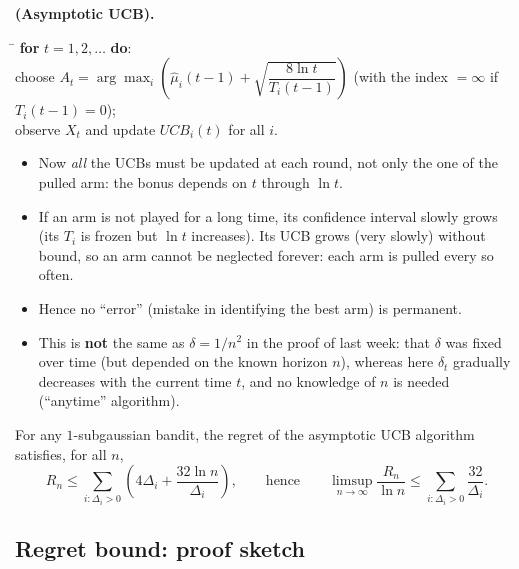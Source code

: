 \begin{definition}\textbf{(Asymptotic UCB).}
\begin{tabbing}
\hspace{1.5em}\=\kill
\textbf{for} $t = 1, 2, \dots$ \textbf{do}: \\
\> choose $A_t = \arg\max_i \left(\hat{\mu}_i(t-1) + \sqrt{\dfrac{8\ln t}{T_i(t-1)}}\right)$ \quad (with the index $= \infty$ if $T_i(t-1) = 0$); \\
\> observe $X_t$ and update $UCB_i(t)$ for all $i$.
\end{tabbing}
\end{definition}

\begin{remark}
\begin{itemize}
    \item Now \emph{all} the UCBs must be updated at each round, not only the one of the pulled arm: the bonus depends on $t$ through $\ln t$.
    \item If an arm is not played for a long time, its confidence interval slowly grows (its $T_i$ is frozen but $\ln t$ increases). Its UCB grows (very slowly) without bound, so an arm cannot be neglected forever: each arm is pulled every so often.
    \item Hence no ``error'' (mistake in identifying the best arm) is permanent.
    \item This is \textbf{not} the same as $\delta = 1/n^2$ in the proof of last week: that $\delta$ was fixed over time (but depended on the known horizon $n$), whereas here $\delta_t$ gradually decreases with the current time $t$, and no knowledge of $n$ is needed (``anytime'' algorithm).
\end{itemize}
\end{remark}

\begin{theorem}
For any $1$-subgaussian bandit, the regret of the asymptotic UCB algorithm satisfies, for all $n$,
\[
R_n \leq \sum_{i:\Delta_i > 0}\left(4\Delta_i + \frac{32\ln n}{\Delta_i}\right),
\qquad\text{hence}\qquad
\limsup_{n\to\infty} \frac{R_n}{\ln n} \leq \sum_{i:\Delta_i > 0} \frac{32}{\Delta_i}.
\]
\end{theorem}

\subsection{Regret bound: proof sketch}


